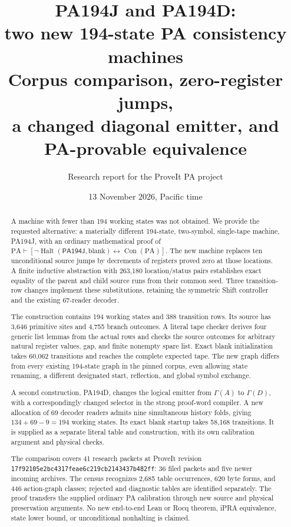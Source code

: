 \documentclass[11pt,letterpaper]{article}
\title{PA194J and PA194D:\\two new 194-state PA consistency machines\\[0.45em]
\large Corpus comparison, zero-register jumps,\\a changed diagonal emitter, and PA-provable equivalence}
\author{Research report for the ProveIt PA project}
\date{13 November 2026, Pacific time}
\newcommand{\PA}{\mathrm{PA}}
\newcommand{\Con}{\operatorname{Con}}
\newcommand{\Halt}{\operatorname{Halt}}
\newcommand{\M}{\mathsf{PA194J}}
\begin{document}
\maketitle
\begin{abstract}
A machine with fewer than 194 working states was not obtained. We provide
the requested alternative: a materially different 194-state, two-symbol,
single-tape machine, PA194J, with an ordinary mathematical proof of
\(\PA\vdash[\neg\Halt(\M,\mathrm{blank})\leftrightarrow\Con(\PA)]\).
The new machine replaces ten unconditional source jumps by decrements of
registers proved zero at those locations. A finite inductive abstraction
with 263,180 location/status pairs establishes exact equality of the
parent and child source runs from their common seed. Three transition-row
changes implement these substitutions, retaining the symmetric Shift
controller and the existing 67-reader decoder.

The construction contains 194 working states and 388 transition rows.
Its source has 3,646 primitive sites and 4,755 branch outcomes. A literal
tape checker derives four generic list lemmas from the actual rows and
checks the source outcomes for arbitrary natural register values, gap,
and finite nonempty spare list. Exact blank initialization takes 60,062
transitions and reaches the complete expected tape. The new graph differs
from every existing 194-state graph in the pinned corpus, even allowing
state renaming, a different designated start, reflection, and global
symbol exchange.

A second construction, PA194D, changes the logical emitter from
\(\Gamma(A)\) to \(\Gamma(D)\), with a correspondingly changed selector
in the strong proof-word compiler. A new allocation of 69 decoder readers
admits nine simultaneous history folds, giving \(134+69-9=194\) working
states. Its exact blank startup takes 58,168 transitions. It is supplied
as a separate literal table and construction, with its own calibration
argument and physical checks.

The comparison covers 41 research packets at ProveIt revision
\nolinkurl{17f92105e2bc4317feae6c219cb2143437b482ff}: 36 filed packets and
five newer incoming archives. The census recognizes 2,685 table
occurrences, 620 byte forms, and 446 action-graph classes; rejected and
diagnostic tables are identified separately. The proof transfers the
supplied ordinary PA calibration through new source and physical
preservation arguments. No new end-to-end Lean or Rocq theorem, iPRA
equivalence, state lower bound, or unconditional nonhalting is claimed.
\end{abstract}
\clearpage
\begingroup
\small
\setlength{\parskip}{0pt}
\tableofcontents
\endgroup
\clearpage
\end{document}
